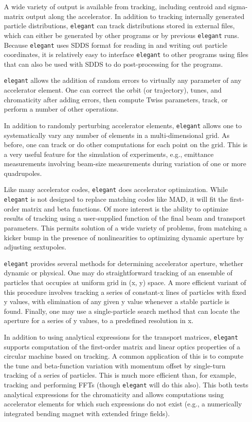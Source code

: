 \documentclass[11pt]{article}
\begin{document}
A wide variety of output is available from tracking, including
centroid and sigma-matrix output along the accelerator.  In addition
to tracking internally generated particle distributions, {\tt elegant}
can track distributions stored in external files, which can either be
generated by other programs or by previous {\tt elegant} runs.
Because {\tt elegant} uses SDDS format for reading in and writing out
particle coordinates, it is relatively easy to interface {\tt elegant}
to other programs using files that can also be used with SDDS to do
post-processing for the programs.

{\tt elegant} allows the addition of random errors to virtually any
parameter of any accelerator element.  One can correct the orbit (or
trajectory), tunes, and chromaticity after adding errors, then compute
Twiss parameters, track, or perform a number of other operations.

In addition to randomly perturbing accelerator elements, {\tt elegant}
allows one to systematically vary any number of elements in a
multi-dimensional grid.  As before, one can track or do other
computations for each point on the grid.  This is a very useful
feature for the simulation of experiments, e.g., emittance
measurements involving beam-size measurements during variation of one
or more quadrupoles\cite{Borland_PC}.

Like many accelerator codes, {\tt elegant} does accelerator
optimization.  While {\tt elegant} is not designed to replace matching
codes like MAD, it will fit the first-order matrix and beta functions.
Of more interest is the ability to optimize results of tracking using
a user-supplied function of the final beam and transport parameters.
This permits solution of a wide variety of problems, from matching a
kicker bump in the presence of nonlinearities to optimizing dynamic
aperture by adjusting sextupoles.

{\tt elegant} provides several methods for determining accelerator
aperture, whether dynamic or physical.  One may do straightforward
tracking of an ensemble of particles that occupies at uniform grid in
(x, y) space.  A more efficient variant of this procedure involves
tracking a series of constant-x lines of particles with fixed y
values, with elimination of any given y value whenever a stable
particle is found.  Finally, one may use a single-particle search
method that can locate the aperture for a series of y values, to a
predefined resolution in x.

In addition to using analytical expressions for the transport
matrices, {\tt elegant} supports computation of the first-order matrix
and linear optics properties of a circular machine based on tracking.
A common application of this is to compute the tune and beta-function
variation with momentum offset by single-turn tracking of a series of
particles.  This is much more efficient than, for example, tracking
and performing FFTs (though {\tt elegant} will do this also).  This
both tests analytical expressions for the chromaticity and allows
computations using accelerator elements for which such expressions do
not exist (e.g., a numerically integrated bending magnet with extended
fringe fields).
\end{document}
